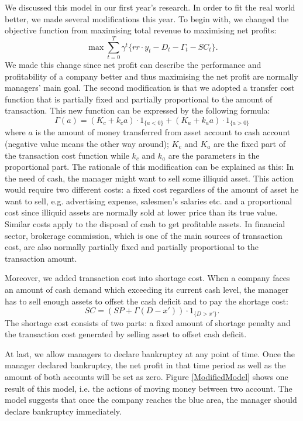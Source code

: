 \documentclass[12pt]{article}
\begin{document}
We discussed this model in our first year's research. In order to fit the real world better, we made several modifications this year. To begin with, we changed the objective function from maximising total revenue to maximising net profits: $$\max \sum^T_{t = 0}\gamma^t  \{ rr \cdot y_t - D_t - \Gamma_t - SC_t \}.$$ We made this change since net profit can describe the performance and profitability of a company better and thus maximising the net profit are normally managers' main goal. The second modification is that we adopted a transfer cost function that is partially fixed and partially proportional to the amount of transaction. This new function can be expressed by the following formula: $$\Gamma(a) =  (K_c + k_c a) \cdot 1_{\{ a < 0\}} + (K_a +k_aa)\cdot 1_{\{a>0\}}$$ where $a$ is the amount of money transferred from asset account to cash account (negative value means the other way around); $K_c$ and $K_a$ are the fixed part of the transaction cost function while $k_c$ and $k_a$ are the parameters in the proportional part. The rationale of this modification can be explained as this: In the need of cash, the manager might want to sell some illiquid asset. This action would require two different costs: a fixed cost regardless of the amount of asset he want to sell, e.g. advertising expense, salesmen's salaries etc. and a proportional cost since illiquid assets are normally sold at lower price than its true value. Similar costs apply to the disposal of cash to get profitable assets. In financial sector, brokerage commission, which is one of the main sources of transaction cost, are also normally partially fixed and partially proportional to the transaction amount.

Moreover, we added transaction cost into shortage cost. When a company faces an amount of cash demand which exceeding its current cash level, the manager has to sell enough assets to offset the cash deficit and to pay the shortage cost: $$SC = (SP + \Gamma(D-x')) \cdot 1_{\{D>x'\}}.$$ The shortage cost consists of two parts: a fixed amount of shortage penalty and the transaction cost generated by selling asset to offset cash deficit. 

At last, we allow managers to declare bankruptcy at any point of time. Once the manager declared bankruptcy, the net profit in that time period as well as the amount of both accounts will be set as zero. Figure \ref{ModifiedModel} shows one result of this model, i.e. the actions of moving money between two account. The model suggests that once the company reaches the blue area, the manager should declare bankruptcy immediately. 
\end{document}
